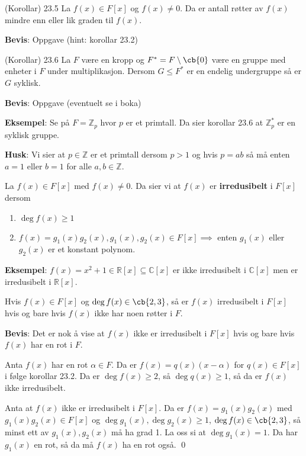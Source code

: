 \begin{theorem*}{(Korollar) 23.5}{}
  La $f(x)\in F[x]$ og $f(x)\neq 0$. Da er antall røtter av $f(x)$ mindre enn eller lik graden
  til $f(x)$.
\end{theorem*}

\textbf{Bevis}: Oppgave (hint: korollar 23.2)

\begin{theorem*}{(Korollar) 23.6}{}
  La $F$ være en kropp og $F^*=F\setminus \cb{0}$ være en gruppe med enheter i $F$ under 
  multiplikasjon. Dersom $G\leq F^*$ er en endelig undergruppe så er $G$ syklisk.
\end{theorem*}

\textbf{Bevis}: Oppgave (eventuelt se i boka)

\textbf{Eksempel}: Se på $F=\mathbb{Z}_p$ hvor $p$ er et primtall. Da sier korollar 23.6 at
$\mathbb{Z}_p^*$ er en syklisk gruppe.

\textbf{Husk}: Vi sier at $p\in \mathbb{Z}$ er et primtall dersom $p>1$ og hvis $p=ab$ så må enten
$a=1$ eller $b=1$ for alle $a,b\in \mathbb{Z}$.

\begin{definition}{}{}
  La $f(x)\in F[x]$ med $f(x)\neq 0$. Da sier vi at $f(x)$ er \textbf{irredusibelt} i $F[x]$
  dersom
  \begin{enumerate}
    \item $\deg f(x)\geq 1$
    \item $f(x)=g_1(x)g_2(x), g_1(x), g_2(x)\in F[x] \implies$ enten $g_1(x)$ eller $g_2(x)$ er
      et konstant polynom.
  \end{enumerate}
\end{definition}

\textbf{Eksempel}: $f(x)=x^2+1\in \mathbb{R}[x]\subseteq \mathbb{C}[x]$ er ikke irredusibelt i
$\mathbb{C}[x]$ men er irredusibelt i $\mathbb{R}[x]$.

\begin{theorem*}{23.10}{}
  Hvis $f(x)\in F[x]$ og $\deg f(x)\in \cb{2,3}$, så er $f(x)$ irredusibelt i $F[x]$ hvis og bare
  hvis $f(x)$ ikke har noen røtter i $F$. 
\end{theorem*} 

\textbf{Bevis}: Det er nok å vise at $f(x)$ ikke er irredusibelt i $F[x]$ hvis og bare hvis $f(x)$
har en rot i $F$. 

Anta $f(x)$ har en rot $\alpha \in F$. Da er $f(x)=q(x)(x-\alpha)$ for $q(x)\in F[x]$ i følge
korollar 23.2. Da er $\deg f(x)\geq 2$, så $\deg q(x)\geq 1$, så da er $f(x)$ ikke irredusibelt.

Anta at $f(x)$ ikke er irredusibelt i $F[x]$. Da er $f(x)=g_1(x)g_2(x)$ med $g_1(x)g_2(x)\in F[x]$
og $\deg g_1(x), \deg g_2(x)\geq 1$, $\deg f(x)\in\cb{2,3}$, så minst ett av $g_1(x),g_2(x)$ må
ha grad 1. La oss si at $\deg g_1(x)=1$. Da har $g_1(x)$ en rot, så da må $f(x)$ ha en rot også.
\qed
